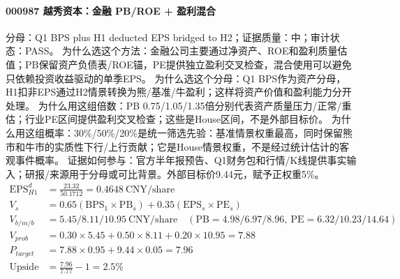 \paragraph{000987 越秀资本：金融 PB/ROE + 盈利混合}
分母：Q1 BPS plus H1 deducted EPS bridged to H2；证据质量：中；审计状态：PASS。
为什么选这个方法：金融公司主要通过净资产、ROE和盈利质量估值；PB保留资产负债表/ROE锚，PE提供独立盈利交叉检查，混合使用可以避免只依赖投资收益驱动的单季EPS。
为什么选这个分母：Q1 BPS作为资产分母，H1扣非EPS通过H2情景转换为熊/基准/牛盈利；这样将资产价值和盈利能力分开处理。
为什么用这组倍数：PB 0.75/1.05/1.35倍分别代表资产质量压力/正常/重估；行业PE区间提供盈利交叉检查；这些是House区间，不是外部目标价。
为什么用这组概率：30\%/50\%/20\%是统一筛选先验：基准情景权重最高，同时保留熊市和牛市的实质性下行/上行贡献；它是House情景权重，不是经过统计估计的客观事件概率。
证据如何参与：官方半年报预告、Q1财务包和行情/K线提供事实输入；研报/来源用于分母或可比背景。外部目标价9.44元，赋予正权重5\%。
\begin{align*}
\mathrm{EPS}_{H1}^d &= \frac{23.32}{50.1712} = 0.4648\ \mathrm{CNY/share}\\
V_s &= 0.65\left(\mathrm{BPS}_1\times \mathrm{PB}_s\right)+0.35\left(\mathrm{EPS}_s\times \mathrm{PE}_s\right)\\
V_{b/m/b} &= 5.45/8.11/10.95\ \mathrm{CNY/share}\quad(\mathrm{PB}=4.98/6.97/8.96,\ \mathrm{PE}=6.32/10.23/14.64)\\
V_{prob} &= 0.30\times 5.45+0.50\times 8.11+0.20\times 10.95=7.88\\
P_{target} &= 7.88\times 0.95+9.44\times 0.05=7.96\\
\mathrm{Upside} &= \frac{7.96}{7.77}-1=2.5\%\\
\end{align*}

